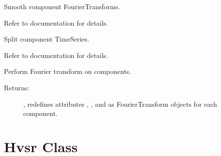 \documentclass[letterpaper,10pt,english,openany,oneside]{sphinxmanual}
\begin{document}
\begin{fulllineitems}
\begin{fulllineitems}
\end{fulllineitems}


\begin{fulllineitems}
\label{\detokenize{index:hvsrpy.Sensor3c.smooth}}
Smooth component FourierTransforms.

Refer to  documentation for details.

\end{fulllineitems}


\begin{fulllineitems}
\label{\detokenize{index:hvsrpy.Sensor3c.split}}
Split component TimeSeries.

Refer to  documentation for details.

\end{fulllineitems}


\begin{fulllineitems}
\label{\detokenize{index:hvsrpy.Sensor3c.transform}}
Perform Fourier transform on components.
\begin{description}
\item[{Returns:}] \leavevmode
{}, redefines attributes , , and  as 
FourierTransform objects for each component.

\end{description}

\end{fulllineitems}


\end{fulllineitems}



\chapter{Hvsr Class}
\label{\detokenize{index:hvsr-class}}
\end{document}
